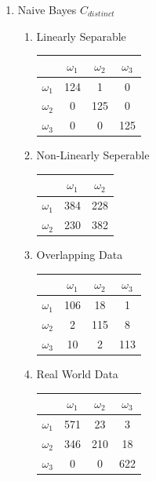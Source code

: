 \documentclass[a4paper]{article}
\begin{document}
\begin{enumerate}
\item Naive Bayes $C_{distinct}$
\begin{multicols}{2}
\begin{enumerate}
\item Linearly Separable

\begin{tabular}{ l | c | c | c | }
& $\omega_1$ & $\omega_2$ & $\omega_3$ \\
\hline
  $\omega_1$ & 124 & 1 & 0 \\ 
\hline
  $\omega_2$ & 0 & 125 & 0 \\
\hline
  $\omega_3$ & 0 & 0 & 125 \\
\hline
\end{tabular}

\item Non-Linearly Seperable

\begin{tabular}{ l | c | c |}

& $\omega_1$ & $\omega_2$ \\
\hline
  $\omega_1$ & 384 & 228 \\ 
\hline
  $\omega_2$ & 230 & 382 \\
\hline
\end{tabular}
\newline

\item Overlapping Data

\begin{tabular}{ l | c | c | c | }
& $\omega_1$ & $\omega_2$ & $\omega_3$ \\
\hline
  $\omega_1$ & 106 & 18 & 1 \\ 
\hline
  $\omega_2$ & 2 & 115 & 8 \\
\hline
  $\omega_3$ & 10 & 2 & 113 \\
\hline
\end{tabular}

\item Real World Data

\begin{tabular}{ l | c | c | c | }
& $\omega_1$ & $\omega_2$ & $\omega_3$ \\
\hline
  $\omega_1$ & 571 & 23 & 3 \\ 
\hline
  $\omega_2$ & 346 & 210 & 18 \\
\hline
  $\omega_3$ & 0 & 0 & 622 \\
\hline
\end{tabular}
\end{enumerate}
\end{multicols}
\end{enumerate}
\end{document}
